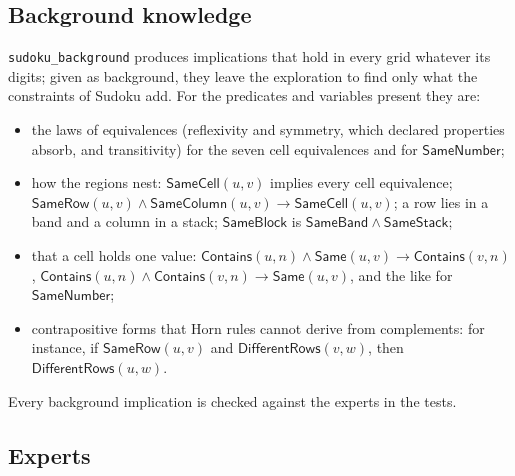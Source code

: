\documentclass[11pt,a4paper]{article}
\theoremstyle{definition}
\theoremstyle{remark}
\newcommand{\code}[1]{\texttt{#1}}
\newcommand{\pred}[1]{\mathsf{#1}}
\begin{document}
\subsection{Background knowledge}\label{sec:solved-background}

\code{sudoku\_background} produces implications that hold in every grid whatever its digits; given as background, they leave the exploration to find only what the constraints of Sudoku add. For the predicates and variables present they are:
\begin{itemize}
  \item the laws of equivalences (reflexivity and symmetry, which declared properties absorb, and transitivity) for the seven cell equivalences and for $\pred{SameNumber}$;
  \item how the regions nest: $\pred{SameCell}(u, v)$ implies every cell equivalence; $\pred{SameRow}(u, v) \wedge \pred{SameColumn}(u, v) \to \pred{SameCell}(u, v)$; a row lies in a band and a column in a stack; $\pred{SameBlock}$ is $\pred{SameBand} \wedge \pred{SameStack}$;
  \item that a cell holds one value: $\pred{Contains}(u, n) \wedge \pred{Same}(u, v) \to \pred{Contains}(v, n)$, $\pred{Contains}(u, n) \wedge \pred{Contains}(v, n) \to \pred{Same}(u, v)$, and the like for $\pred{SameNumber}$;
  \item contrapositive forms that Horn rules cannot derive from complements: for instance, if $\pred{SameRow}(u, v)$ and $\pred{DifferentRows}(v, w)$, then $\pred{DifferentRows}(u, w)$.
\end{itemize}
Every background implication is checked against the experts in the tests.

\subsection{Experts}\label{sec:solved-experts}
\end{document}
